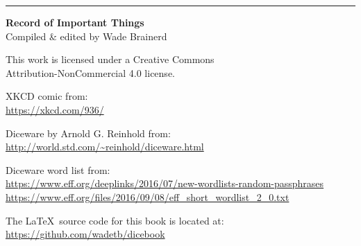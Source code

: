

\vfill
\rule{\textwidth}{.5pt}

\changepage{1em}{}{}{}{}{}{}{}{}

\textbf{Record of Important Things} \ccbync \\
\scriptsize
Compiled \& edited by Wade Brainerd

This work is licensed under a Creative Commons \\ Attribution-NonCommercial 4.0 license.

XKCD comic from: \\
\url{https://xkcd.com/936/}

Diceware by Arnold G. Reinhold from: \\
\url{http://world.std.com/~reinhold/diceware.html}

Diceware word list from: \\ \url{https://www.eff.org/deeplinks/2016/07/new-wordlists-random-passphrases} \\
\url{https://www.eff.org/files/2016/09/08/eff_short_wordlist_2_0.txt}

The \LaTeX\ source code for this book is located at: \\ \url{https://github.com/wadetb/dicebook}

